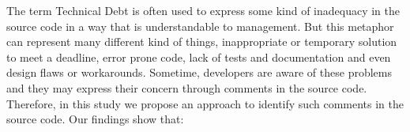 The term Technical Debt is often used to express some kind of inadequacy in the source code in a way that is understandable to management. But this metaphor can represent many different kind of things, inappropriate or temporary solution to meet a deadline, error prone code, lack of tests and documentation and even design flaws or workarounds. Sometime, developers are aware of these problems and they may express their concern through comments in the source code. Therefore, in this study we propose an approach to identify such comments in the source code. Our findings show that:




